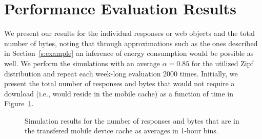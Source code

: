 \documentclass[letterpaper,conference]{IEEEtran}
\begin{document}
\section{Performance Evaluation Results}
\label{s:results}
We present our results for the individual responses or web objects and the total number of bytes, noting that through approximations such as the ones described in Section~\ref{s:example} an inference of energy consumption would be possible as well.
We perform the simulations with an average $\alpha=0.85$ for the utilized Zipf distribution and repeat each week-long evaluation 2000 times.
Initially, we present the total number of responses and bytes that would not require a download (i.e., would reside in the mobile cache) as a function of time in Figure~\ref{fig:sim1}.
\begin{figure}[h!]
	\centering
	\qquad
	\caption{Simulation results for the number of responses and bytes that are in the transfered mobile device cache as averages in 1-hour bins.}
	\label{fig:sim1}
\end{figure}
\end{document}
